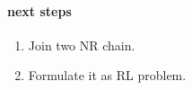 \documentclass[12pt]{article}
\begin{document}
\paragraph{next steps}
\begin{enumerate}[nolistsep]
    \item Join two NR chain.
    \item Formulate it as RL problem.
\end{enumerate}
\end{document}
